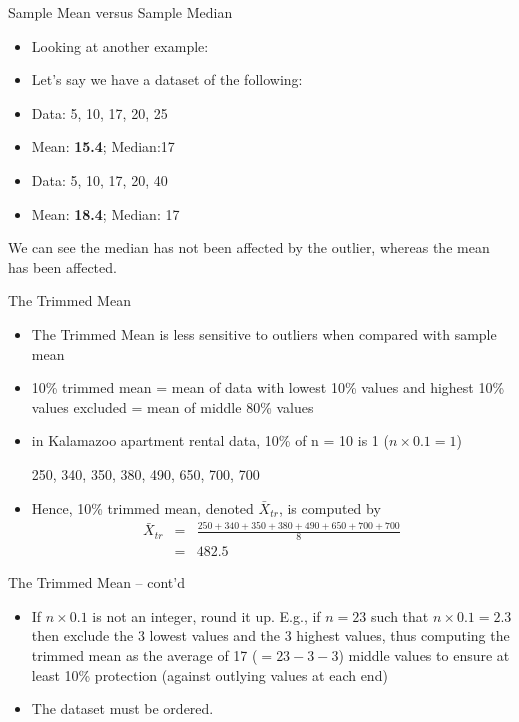 \documentclass[14pt]{beamer}\usepackage[]{graphicx}\usepackage[]{color}
\begin{document}
\begin{frame}[fragile]{Sample Mean versus Sample Median}

\begin{itemize}
\item Looking at another example:
\item Let's say we have a dataset of the following:  
\item Data: 5, 10, 17, 20, 25
\item Mean: \textbf{15.4}; Median:17
\item Data: 5, 10, 17, 20, 40
\item Mean: \textbf{18.4};  Median: 17
\end{itemize}

We can see the median has not been affected by the outlier, whereas the  mean has been affected.

\end{frame}

\begin{frame}[fragile]{The Trimmed Mean}


{\small{
\begin{itemize}
\item<1-> The Trimmed Mean is less sensitive to outliers when compared with sample mean  
\item<2-> 10\% trimmed mean = mean of data with lowest 10\% values and  highest 10\% values excluded = mean of middle 80\% values
\item<3-> in Kalamazoo apartment rental data, 10\% of n = 10 is 1 ($n \times 0.1 = 1$)

250, 340, 350, 380, 490, 650, 700, 700
\item<4-> Hence, 10\% trimmed mean, denoted $\bar{X}_{tr}$, is computed by
\begin{eqnarray*}
\bar{X}_{tr} &=& \frac{250+340+350+380+490+650+700+700}{8} \\
     &=&482.5
\end{eqnarray*}
\end{itemize}
}}
\end{frame}

\begin{frame}[fragile]{The Trimmed Mean -- cont'd}

\begin{itemize}
\item<1-> If $n \times 0.1$ is not an integer, round it up. E.g., if $n = 23$ such that  $n \times 0.1 = 2.3$ then exclude the 3 lowest values and the 3 highest values, thus computing the trimmed mean as the  average of 17 ($= 23 - 3 - 3$) middle values to ensure at least  10\% protection (against outlying values at each end)

\item<2-> The dataset must be ordered.
\end{itemize}

\end{frame}
\end{document}
